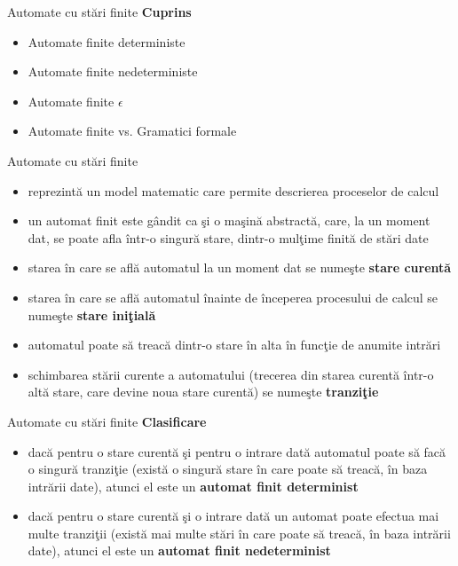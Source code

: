 \documentclass[pdf]{beamer}
\begin{document}
\begin{frame}{Automate cu stări finite}
\textbf{Cuprins}
\begin{itemize}
\item
Automate finite deterministe
\item
Automate finite nedeterministe
\item
Automate finite $\epsilon$
\item
Automate finite vs. Gramatici formale
\end{itemize}
\end{frame}



\begin{frame}{Automate cu stări finite}
\begin{itemize}
\item
reprezintă un model matematic care permite descrierea proceselor de calcul
\item
un automat finit este gândit ca şi o maşină abstractă, care, la un moment dat, se poate afla într-o singură stare, dintr-o mulţime finită de stări date
\item
starea în care se află automatul la un moment dat se numeşte \textbf{stare curentă}
\item
starea în care se află automatul înainte de începerea procesului de calcul se numeşte \textbf{stare iniţială}
\item
automatul poate să treacă dintr-o stare în alta în funcţie de anumite intrări
\item
schimbarea stării curente a automatului (trecerea din starea curentă într-o altă stare, care devine noua stare curentă) se numeşte \textbf{tranziţie}
\end{itemize}
\end{frame}



\begin{frame}{Automate cu stări finite}
\textbf{Clasificare}
\begin{itemize}
\item
dacă pentru o stare curentă şi pentru o intrare dată automatul poate să facă o singură tranziţie (există o singură stare în care poate să treacă, în baza intrării date), atunci el este un \textbf{automat finit determinist}
\item
dacă pentru o stare curentă şi o intrare dată un automat poate efectua mai multe tranziţii (există mai multe stări în care poate să treacă, în baza intrării date), atunci el este un \textbf{automat finit nedeterminist}
\end{itemize}
\end{frame}
\end{document}
